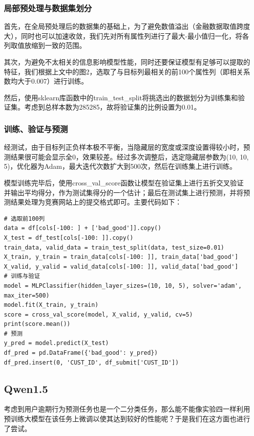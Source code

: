 \documentclass[UTF8]{article}
\begin{document}
\subsubsection{局部预处理与数据集划分}
首先，在全局预处理后的数据集的基础上，为了避免数值溢出（金融数据取值跨度大），同时也可以加速收敛，我们先对所有属性列进行了最大-最小值归一化，将各列取值放缩到一致的范围。

其次，为避免不太相关的信息影响模型性能，同时还要保证模型有足够可以提取的特征，我们根据上文中的图2，选取了与目标列最相关的前100个属性列（即相关系数均大于0.007）进行训练。

然后，使用sklearn库函数中的train\_test\_split将挑选出的数据划分为训练集和验证集。考虑到总样本数为285285，故将验证集的比例设置为0.01。

\subsubsection{训练、验证与预测}
经测试，由于目标列正负样本极不平衡，当隐藏层的宽度或深度设置得较小时，预测结果很可能会显示全0，效果较差。经过多次调整后，选定隐藏层参数为(10, 10, 5)，优化器为Adam，最大迭代次数扩大到500次，然后在训练集上进行训练。

模型训练完毕后，使用cross\_val\_score函数让模型在验证集上进行五折交叉验证并输出平均得分，作为测试集得分的一个估计；最后在测试集上进行预测，并将预测结果处理为竞赛网站上的提交格式即可。主要代码如下：
\begin{lstlisting}
# 选取前100列
data = df[cols[-100: ] + ['bad_good']].copy()
X_test = df_test[cols[-100: ]].copy()
train_data, valid_data = train_test_split(data, test_size=0.01)
X_train, y_train = train_data[cols[-100: ]], train_data['bad_good']
X_valid, y_valid = valid_data[cols[-100: ]], valid_data['bad_good']
# 训练与验证
model = MLPClassifier(hidden_layer_sizes=(10, 10, 5), solver='adam', max_iter=500)
model.fit(X_train, y_train)
score = cross_val_score(model, X_valid, y_valid, cv=5)
print(score.mean())
# 预测
y_pred = model.predict(X_test)
df_pred = pd.DataFrame({'bad_good': y_pred})
df_pred.insert(0, 'CUST_ID', df_submit['CUST_ID'])
\end{lstlisting}


\subsection{Qwen1.5}
考虑到用户逾期行为预测任务也是一个二分类任务，那么能不能像实验四一样利用预训练大模型在该任务上微调以使其达到较好的性能呢？于是我们在这方面也进行了尝试。
\end{document}
